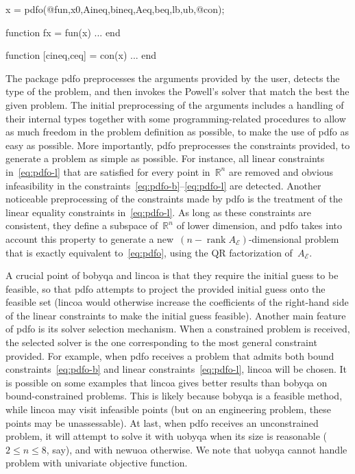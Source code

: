 \documentclass[
    smallextended,  %
    final,        %
]{svjour3}
\DeclareMathOperator\rank{rank}
\newcommand{\R}{\mathbb{R}}
\newcommand{\aeq}{A_{\scriptscriptstyle\mathcal{E}}}
\begin{document}
\begin{matlablst}[%
    caption=An elementary example of \gls{pdfo} in MATLAB,
    label=lst:minex
]
    x = pdfo(@fun,x0,Aineq,bineq,Aeq,beq,lb,ub,@con);

    function fx = fun(x)
    ...
    end

    function [cineq,ceq] = con(x)
    ...
    end
\end{matlablst}

The package \gls{pdfo} preprocesses the arguments provided by the user, detects the type of the problem, and then invokes the Powell's solver that match the best the given problem.
The initial preprocessing of the arguments includes a handling of their internal types together with some programming-related procedures to allow as much freedom in the problem definition as possible, to make the use of \gls{pdfo} as easy as possible.
More importantly, \gls{pdfo} preprocesses the constraints provided, to generate a problem as simple as possible.
For instance, all linear constraints in~\eqref{eq:pdfo-l} that are satisfied for every point
in~$\R^n$ are removed and obvious infeasibility in the constraints~\mbox{\eqref{eq:pdfo-b}--\eqref{eq:pdfo-l}} are detected.
Another noticeable preprocessing of the constraints made by \gls{pdfo} is the treatment of the linear equality constraints in~\eqref{eq:pdfo-l}.
As long as these constraints are consistent, they define a subspace of~$\R^n$ of lower dimension, and \gls{pdfo} takes into account this property to generate a new~$(n - \rank \aeq)$-dimensional problem that is exactly equivalent to~\eqref{eq:pdfo}, using the QR factorization of~$\aeq$.

A crucial point of \gls{bobyqa} and \gls{lincoa} is that they require the initial guess to be feasible, so that \gls{pdfo} attempts to project the provided initial guess onto the feasible set (\gls{lincoa} would otherwise increase the coefficients of the right-hand side of the linear constraints to make the initial guess feasible).
Another main feature of \gls{pdfo} is its solver selection mechanism.
When a constrained problem is received, the selected solver is the one corresponding to the most general constraint provided.
For example, when \gls{pdfo} receives a problem that admits both bound constraints~\eqref{eq:pdfo-b}
and linear constraints~\eqref{eq:pdfo-l}, \gls{lincoa} will be chosen.
It is possible on some examples that \gls{lincoa} gives better results than \gls{bobyqa} on bound-constrained problems.
This is likely because \gls{bobyqa} is a feasible method, while \gls{lincoa} may visit infeasible points (but on an engineering problem, these points may be unassessable).
At last, when \gls{pdfo} receives an unconstrained problem, it will attempt to solve it with \gls{uobyqa} when its size is reasonable ($2 \le n \le 8$, say), and with \gls{newuoa} otherwise.
We note that \gls{uobyqa} cannot handle problem with univariate objective function.
\end{document}
